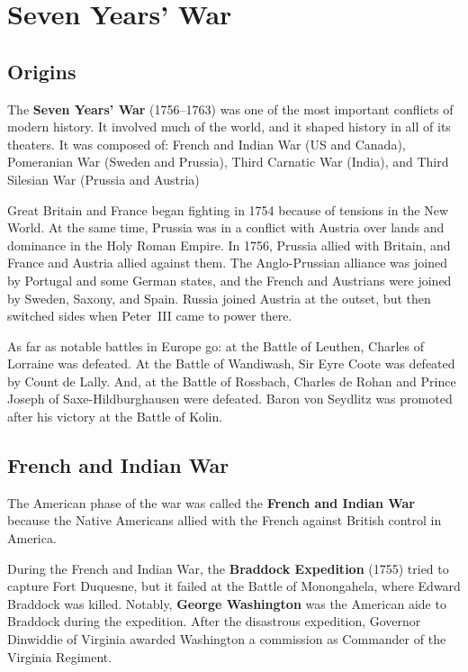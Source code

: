 \section{Seven Years' War}

\subsection*{Origins}

The \textbf{Seven Years' War} (1756--1763) was one of the most important conflicts of modern history.
It involved much of the world, and it shaped history in all of its theaters.
It was composed of:
French and Indian War (US and Canada),
Pomeranian War (Sweden and Prussia),
Third Carnatic War (India),
and Third Silesian War (Prussia and Austria)

Great Britain and France began fighting in 1754 because of tensions in the New World.
At the same time, Prussia was in a conflict with Austria over lands and dominance in the Holy Roman Empire.
In 1756, Prussia allied with Britain, and France and Austria allied against them.
The Anglo-Prussian alliance was joined by Portugal and some German states,
and the French and Austrians were joined by Sweden, Saxony, and Spain.
Russia joined Austria at the outset, but then switched sides when Peter~III came to power there.

As far as notable battles in Europe go: at the Battle of Leuthen, Charles of Lorraine was defeated.
At the Battle of Wandiwash, Sir Eyre Coote was defeated by Count de Lally.
And, at the Battle of Rossbach, Charles de Rohan and Prince Joseph of Saxe-Hildburghausen were defeated.
Baron von Seydlitz was promoted after his victory at the Battle of Kolin.

\subsection*{French and Indian War}

The American phase of the war was called the \textbf{French and Indian War}
because the Native Americans allied with the French against British control in America.

During the French and Indian War, the \textbf{Braddock Expedition} (1755) tried to capture Fort Duquesne,
but it failed at the Battle of Monongahela, where Edward Braddock was killed.
Notably, \textbf{George Washington} was the American aide to Braddock during the expedition.
After the disastrous expedition,
Governor Dinwiddie of Virginia awarded Washington a commission as Commander of the Virginia Regiment.

